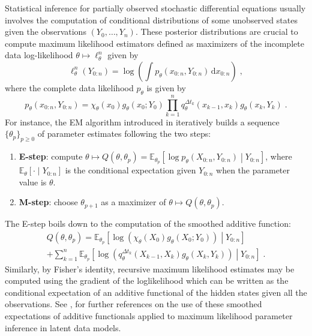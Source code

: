 \documentclass[12pt]{article}
\newcommand{\rmd}{\mathrm{d}}
\newcommand{\eqsp}{\;}
\newcommand{\1}{\mathrm{1}}
\begin{document}
Statistical inference for partially observed stochastic differential equations usually involves the computation of conditional distributions of some unobserved states given the observations $(Y_0,\ldots,Y_n)$. These posterior distributions are crucial to compute maximum likelihood estimators defined as maximizers of the incomplete data log-likelihood $\theta\mapsto \ell_{\theta}^{n}$ given by
\begin{equation*}
\ell_{\theta}^{n}(Y_{0:n}) = \log\left(\int p_{\theta}(x_{0:n},Y_{0:n})\,\rmd x_{0:n}\right)\eqsp,
\end{equation*}  
where the complete data likelihood $p_{\theta}$ is given by
\begin{equation*}
p_{\theta}(x_{0:n},Y_{0:n}) = \chi_{\theta}(x_0)g_{\theta}(x_0;Y_0)\prod^{n}_{k=1}q^{\Delta t_k}_{\theta}(x_{k-1},x_k)g_{\theta}(x_k,Y_k)\eqsp.
\end{equation*}
For instance, the EM algorithm introduced in \cite{dempster:laird:rubin:1977} iteratively builds a sequence $\{\theta_{p}\}_{p\ge 0}$ of parameter estimates following the two steps:
\begin{enumerate}
	\item {\bf E-step}: compute $\theta \mapsto Q(\theta,\theta_{p}) = \mathbb{E}_{\theta_p}\left[\log p_{\theta}(X_{0:n},Y_{0:n})\middle|Y_{0:n}\right]$, where $\mathbb{E}_{\theta}\left[\cdot\middle|Y_{0:n}\right]$ is the conditional expectation given $Y_{0:n}$ when the parameter value is $\theta$.
	\item {\bf M-step}: choose $\theta_{p+1}$ as a maximizer of $\theta \mapsto Q(\theta,\theta_{p})$.
\end{enumerate}
The E-step boils down to the computation of the smoothed additive function: 
\begin{multline*}
Q(\theta,\theta_{p}) = \mathbb{E}_{\theta_p}\left[\log \left(\chi_{\theta}(X_0)g_{\theta}(X_0;Y_0)\right)\middle|Y_{0:n}\right] \\
+ \sum_{k=1}^n\mathbb{E}_{\theta_p}\left[\log \left(q^{\Delta t_k}_{\theta}(X_{k-1},X_k)g_{\theta}(X_k,Y_k)\right)\middle|Y_{0:n}\right] \eqsp.
\end{multline*}
Similarly, by Fisher's identity, recursive maximum likelihood estimates may be computed using the gradient of the loglikelihood which can be written as the conditional expectation of an additive functional of the hidden states given all the observations. See \cite[Chapter $10$ and $11$]{cappe:moulines:ryden:2005}, \cite{kantas:doucet:signh:2015,doucet:poyiadjis:singh:2011,lecorff:fort:2013a,lecorff:fort:2013b}
for further references on the use of these smoothed expectations of additive functionals  applied to maximum likelihood parameter inference in latent data models.
\end{document}
